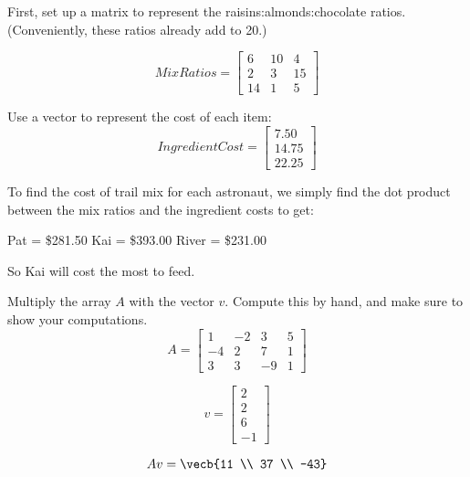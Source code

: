 First, set up a matrix to represent the raisins:almonds:chocolate ratios. (Conveniently, these ratios already add to 20.)

$$MixRatios = \begin{bmatrix}
6 & 10 & 4  \\
2 & 3 & 15 \\
14 & 1 & 5
\end{bmatrix}$$

Use a vector to represent the cost of each item:
$$IngredientCost = 
\begin{bmatrix}
7.50 \\
14.75 \\
22.25
\end{bmatrix}$$

To find the cost of trail mix for each astronaut, we simply find the dot product between the mix ratios and the ingredient costs to get:

Pat =  \$281.50 \newline
Kai =  \$393.00 \newline
River = \$231.00 \newline

So Kai will cost the most to feed.


\begin{Exercise}[title={Vector Matrix Multiplication}, label=vector-matrix-multiply01]
Multiply the array $A$ with the vector $v$. Compute this by hand, and make sure to show your computations. 
$$A = \begin{bmatrix}
1 & -2 & 3 & 5  \\
-4 & 2 & 7 & 1 \\
3 & 3  & -9 & 1
\end{bmatrix}$$

$$v = 
\begin{bmatrix}
 2 \\
 2 \\
 6 \\
 -1
 \end{bmatrix}$$
\end{Exercise}

\begin{Answer}[ref=vector-matrix-multiply01]
$$Av = \vecb{11 \\ 37 \\ -43}$$
\end{Answer}


